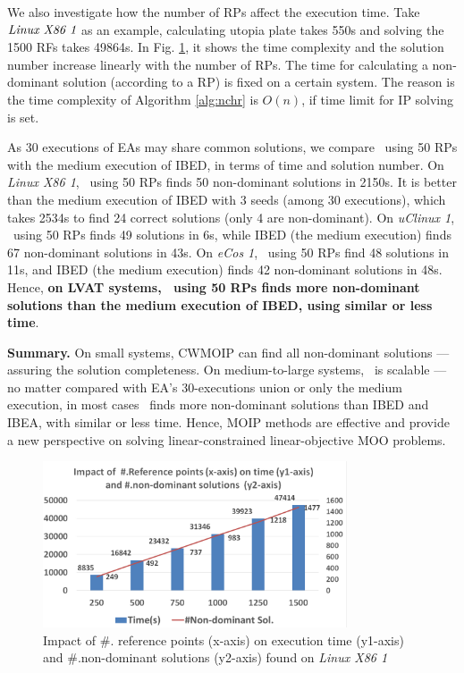 We also investigate how the number of RPs affect the execution time. Take $\emph{Linux X86 1}$ as an example, calculating utopia plate takes 550s and solving the 1500 RFs takes 49864s. In Fig. \ref{fig:referPoint}, it shows the time complexity and the solution number increase linearly with the number of RPs. The time for calculating a non-dominant solution (according to a RP) is fixed on a certain system. The reason is the time complexity of Algorithm \ref{alg:nchr} is $O(n)$, if time limit for IP solving is set.

As 30 executions of EAs may share common solutions, we compare \ourSol~using 50 RPs with the medium execution of IBED, in terms of time and solution number. On \emph{Linux X86 1}, \ourSol~using 50 RPs finds 50 non-dominant solutions in 2150s. It is better than the medium execution of IBED with 3 seeds (among 30 executions), which takes 2534s to find 24 correct solutions (only 4 are non-dominant). On \emph{uClinux 1}, \ourSol~using 50 RPs finds 49 solutions in 6s, while IBED (the medium execution) finds 67 non-dominant solutions in 43s. On \emph{eCos 1},  \ourSol~using 50 RPs find 48 solutions in 11s, and IBED (the medium execution) finds 42 non-dominant solutions in 48s. Hence, \textbf{on LVAT systems, \ourSol~using 50 RPs finds more non-dominant solutions than the medium execution of IBED, using similar or less time}.

\noindent\textbf{Summary.} On small systems, CWMOIP can find all non-dominant solutions --- assuring the solution completeness.
On medium-to-large systems, \ourSol~is scalable --- no matter compared with EA's 30-executions union or only the medium execution, in most cases \ourSol~finds more non-dominant solutions than IBED and IBEA, with similar or less time. Hence, MOIP methods are effective and provide a new perspective on solving linear-constrained linear-objective MOO problems.%
\begin{figure}[t]
\vspace{-2mm}
\centering
\includegraphics[width= 9cm]{image/rf.png}
\vspace{-6mm}
\caption{Impact of \#. reference points (x-axis) on execution time (y1-axis) and \#.non-dominant solutions (y2-axis) found on \emph{Linux X86 1} }
\label{fig:referPoint}
\end{figure}
